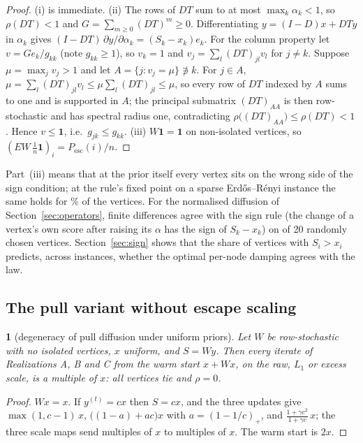 \documentclass[11pt,a4paper]{article}
\theoremstyle{definition}
\theoremstyle{plain}
\newcommand{\genpropname}{}
\newtheorem*{genprop}{\genpropname}
\newenvironment{prop}[1]{\renewcommand{\genpropname}{Proposition #1}\begin{genprop}}{\end{genprop}}
\newcommand{\Pesc}{P_{\mathrm{esc}}}
\newcommand{\one}{\mathbf{1}}
\begin{document}
\begin{proof}
(i) is immediate. (ii) The rows of $DT$ sum to at most $\max_k\alpha_k<1$, so $\rho(DT)<1$ and $G=\sum_{m\ge0}(DT)^m\ge0$. Differentiating $y=(I-D)x+DTy$ in $\alpha_k$ gives $(I-DT)\,\partial y/\partial\alpha_k=(S_k-x_k)e_k$. For the column property let $v=Ge_k/g_{kk}$ (note $g_{kk}\ge1$), so $v_k=1$ and $v_j=\sum_l(DT)_{jl}v_l$ for $j\ne k$. Suppose $\mu=\max_jv_j>1$ and let $A=\{j:v_j=\mu\}\not\ni k$. For $j\in A$, $\mu=\sum_l(DT)_{jl}v_l\le\mu\sum_l(DT)_{jl}\le\mu$, so every row of $DT$ indexed by $A$ sums to one and is supported in $A$; the principal submatrix $(DT)_{AA}$ is then row-stochastic and has spectral radius one, contradicting $\rho\big((DT)_{AA}\big)\le\rho(DT)<1$. Hence $v\le\one$, i.e.\ $g_{jk}\le g_{kk}$. (iii) $W\one=\one$ on non-isolated vertices, so $(EW\,\tfrac1n\one)_i=\Pesc(i)/n$.
\end{proof}

Part~(iii) means that at the prior itself every vertex sits on the wrong side of the sign condition; at the rule's fixed point on a sparse Erdős--Rényi instance the same holds for \SparseFracSbelowX\% of the vertices. For the normalised diffusion of Section~\ref{sec:operators}, finite differences agree with the sign rule (the change of a vertex's own score after raising its $\alpha$ has the sign of $S_k-x_k$) on \SignAgree{} of 20 randomly chosen vertices. Section~\ref{sec:sign} shows that the share of vertices with $S_i>x_i$ predicts, across instances, whether the optimal per-node damping agrees with the law.

\subsection{The pull variant without escape scaling}

\begin{prop}{F}[degeneracy of pull diffusion under uniform priors]
Let $W$ be row-stochastic with no isolated vertices, $x$ uniform, and $S=Wy$. Then every iterate of Realizations A, B and C from the warm start $x+Wx$, on the raw, $L_1$ or excess scale, is a multiple of $x$: all vertices tie and $\rho=0$.
\end{prop}

\begin{proof}
$Wx=x$. If $y^{(t)}=cx$ then $S=cx$, and the three updates give $\max(1,c-1)\,x$, $\big((1-a)+ac\big)x$ with $a=(1-1/c)_+$, and $\frac{1+\gamma c^2}{1+\gamma c}\,x$; the three scale maps send multiples of $x$ to multiples of $x$. The warm start is $2x$.
\end{proof}
\end{document}
